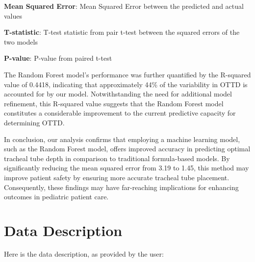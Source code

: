 \documentclass[11pt]{article}
\begin{document}
\begin{table}[h]
\caption{Comparison of prediction errors from Random Forest model and a formula-based model}
\label{table:table_1}
\begin{threeparttable}
\renewcommand{\TPTminimum}{\linewidth}
\begin{tablenotes}
\footnotesize
\item \textbf{Mean Squared Error}: Mean Squared Error between the predicted and actual values
\item \textbf{T-statistic}: T-test statistic from pair t-test between the squared errors of the two models
\item \textbf{P-value}: P-value from paired t-test
\end{tablenotes}
\end{threeparttable}
\end{table}


The Random Forest model's performance was further quantified by the R-squared value of 0.4418, indicating that approximately 44\% of the variability in OTTD is accounted for by our model. Notwithstanding the need for additional model refinement, this R-squared value suggests that the Random Forest model constitutes a considerable improvement to the current predictive capacity for determining OTTD.

In conclusion, our analysis confirms that employing a machine learning model, such as the Random Forest model, offers improved accuracy in predicting optimal tracheal tube depth in comparison to traditional formula-based models. By significantly reducing the mean squared error from 3.19 to 1.45, this method may improve patient safety by ensuring more accurate tracheal tube placement. Consequently, these findings may have far-reaching implications for enhancing outcomes in pediatric patient care.


\clearpage
\appendix

\section{Data Description} \label{sec:data_description} Here is the data description, as provided by the user:
\end{document}
